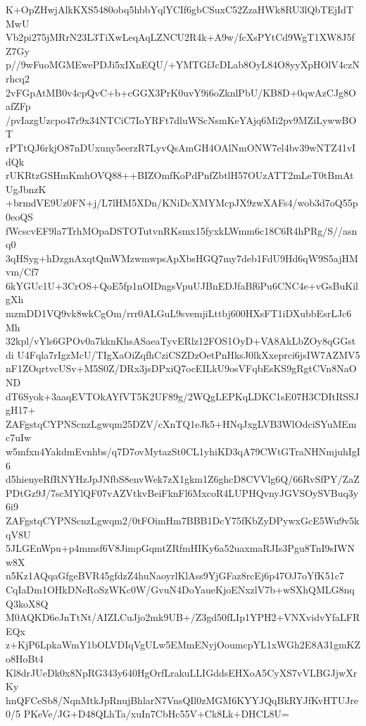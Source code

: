 K+OpZHwjAlkKXS5480obq5hbbYqlYCIf6gbCSuxC52ZzaHWk8RU3lQbTEjIdTMwU
Vb2pi275jMRrN23L3TiXwLeqAqLZNCU2R4k+A9w/fcXsPYtCd9WgT1XW8J5fZ7Gy
p//9wFuoMGMEwePDJi5xIXnEQU/+YMTGfJcDLab8OyL84O8yyXpHOlV4czNrhcq2
2vFGpAtMB0v4cpQvC+b+cGGX3PrK0uvY9i6oZknlPbU/KB8D+0qwAzCJg8OafZFp
/pvIazgUzcpo47r9x34NTCiC7IoYRFt7dluWScNsmKeYAjq6Mi2pv9MZiLywwBOT
rPTtQJ6rkjO87nDUxuny5eerzR7LyvQsAmGH4OAlNmONW7el4bv39wNTZ41vIdQk
rUKRtzGSHmKmhOVQ88++BIZOmfKoPdPnfZbtlH57OUzATT2mLeT0tBmAtUgJbnzK
+brmdVE9Uz0FN+j/L7lHM5XDn/KNiDcXMYMcpJX9zwXAFs4/wob3d7oQ55p0eoQS
fWcscvEF9la7TrhMOpaDSTOTutvnRKsmx15fyxkLWmm6c18C6R4hPRg/S//asnq0
3qHSyg+hDzgnAxqtQmWMzwmwpsApXbsHGQ7my7deb1FdU9Hd6qW9S5ajHMvm/Cf7
6kYGUc1U+3CrOS+QoE5fp1nOIDngsVpuUJBnEDJfaBf6Pu6CNC4e+vGsBuKilgXh
mzmDD1VQ9vk8wkCgOm/rrr0ALGuL9svemjiLttbj600HXsFT1iDXubbEsrLJc6Mh
32kpl/vYls6GPOv0a7kknKhsASaeaTyvERlz12FOS1OyD+VA8AkLbZOy8qGGstdi
U4Fqla7rIgzMcU/TIgXaOiZqfhCziCSZDzOetPnHksJ0lkXxeprci6jsIW7AZMV5
nF1ZOqrtvcUSv+M5S0Z/DRx3jsDPxiQ7ocEILkU9osVFqbEsKS9gRgtCVn8NaOND
dT6Syok+3aaqEVTOkAYfVT5K2UF89g/2WQgLEPKqLDKC1sE07H3CDItRSSJgH17+
ZAFgstqCYPNScnzLgwqm25DZV/cXnTQ1eJk5+HNqJxgLVB3WlOdciSYuMEmc7uIw
w5mfxn4YakdmEvnhbs/q7D7ovMytazSt0CL1yhiKD3qA79CWtGTraNHNmjuhIgI6
d5hienyeRfRNYHzJpJNfbS8envWek7zX1gkm1Z6ghcD8CVVlg6Q/66RvSfPY/ZaZ
PDtGz9J/7scMYlQF07vAZVtkvBeiFknFl6MxcoR4LUPHQvnyJGVSOySVBuq3y6i9
ZAFgstqCYPNScnzLgwqm2/0tFOimHm7BBB1DcY75fKbZyDPywxGcE5Wu9v5kqV8U
5JLGEnWpu+p4mmsf6V8JimpGqmtZRfmHIKy6a52uaxmaRJIs3Pgu8TnI9sIWNw8X
n5Kz1AQqaGfgeBVR45gfdzZ4huNaoyrlKlAss9YjGFaz8rcEj6p47OJ7oYfK51c7
CqIaDm1OHkDNeRoSzWKc0W/GvuN4DoYaueKjoENxzlV7b+wSXhQMLG8nqQ3koX8Q
M0AQKD6eJnTtNt/AIZLCuJjo2mk9UB+/Z3gd50fLIp1YPH2+VNXvidvYfaLFREQx
z+KjP6LpkaWmY1bOLVDIqVgULw5EMmENyjOoumcpYL1xWGh2E8A31gmKZo8HoBt4
Kl8drJUeDk0x8NpRG343y640HgOrfLrakuLLIGddsEHXoA5CyXS7vVLBGJjwXrKy
hnQFCeSb8/NqnMtkJpRnujBhlarN7VnsQIl0zMGM6KYYJQqBkRYJfKvHTUJre0/5
PKeVe/JG+D48QLhTa/xuIn7CbHc55V+Ck8Lk+DHCL8U=
